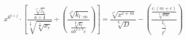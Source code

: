 \documentclass[10pt,a4paper]{article}
\author{Kelko Laszlo}
\begin{document}
$$ x^{6^{k+j}}\cdot\left[\frac{\frac{\sqrt[5^{4}]{j_{k}}}{a\div 4}}{\sqrt[\frac{b}{c}]{\sqrt[\frac{3}{b^{2}}]{x_{i}}}}\div \left( \frac{\sqrt[4^{m}]{k_{l \cdot m}}}{\frac{\sqrt[\frac{6}{4}]{k_{l}}}{ab^{4+5}c}} \right)\right] = \frac{\sqrt[c^{x}]{x^{c+m}}}{\sqrt[k_{i}]{D}} - \left( \frac{\frac{c.(m+c)}{\sqrt[3]{mc}}}{\frac{l_{i_{j}}}{l^{i^{j}}}} \right) $$
\end{document}
